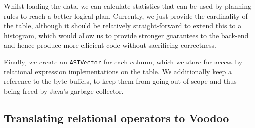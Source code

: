 Whilst loading the data, we can calculate statistics that can be used by planning rules to reach a better logical plan. Currently, we just provide the cardinality of the table, although it should be relatively straight-forward to extend this to a histogram, which would allow us to provide stronger guarantees to the back-end and hence produce more efficient code without sacrificing correctness.

Finally, we create an \texttt{ASTVector} for each column, which we store for access by relational expression implementations on the table. We additionally keep a reference to the byte buffers, to keep them from going out of scope and thus being freed by Java's garbage collector.

\subsection{Translating relational operators to Voodoo}

